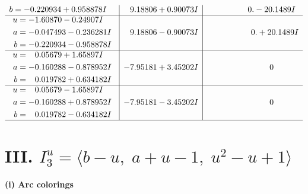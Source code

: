 \documentclass[1p]{elsarticle_modified}
\theoremstyle{definition}
\begin{document}
$$\begin{array}{c|c|c}
\begin{aligned}
b &= -0.220934 + 0.958878 I\end{aligned}
 & \phantom{-}9.18806 + 0.90073 I & \phantom{-0.000000 } 0. - 20.1489 I \\ \hline\begin{aligned}
u &= -1.60870 - 0.24907 I \\
a &= -0.047493 - 0.236281 I \\
b &= -0.220934 - 0.958878 I\end{aligned}
 & \phantom{-}9.18806 - 0.90073 I & \phantom{-0.000000 -}0. + 20.1489 I \\ \hline\begin{aligned}
u &= \phantom{-}0.05679 + 1.65897 I \\
a &= -0.160288 - 0.878952 I \\
b &= \phantom{-}0.019782 + 0.634182 I\end{aligned}
 & -7.95181 + 3.45202 I & \phantom{-0.000000 } 0 \\ \hline\begin{aligned}
u &= \phantom{-}0.05679 - 1.65897 I \\
a &= -0.160288 + 0.878952 I \\
b &= \phantom{-}0.019782 - 0.634182 I\end{aligned}
 & -7.95181 - 3.45202 I & \phantom{-0.000000 } 0\\
 \hline 
 \end{array}$$\newpage\newpage\renewcommand{\arraystretch}{1}
\centering \section*{III. $I^u_{3}= \langle b- u,\;a+u-1,\;u^2- u+1 \rangle$}
\flushleft \textbf{(i) Arc colorings}\\
\end{document}
